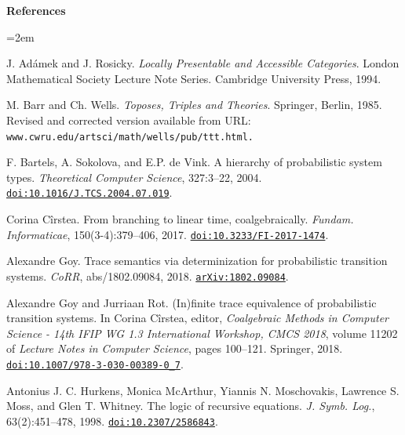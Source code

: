 \documentclass[11pt,a4paper]{amsart}
\begin{document}
%
\hypertarget{html:bib}{} \par\noindent\textbf{References}\quad  
\begin{list}{}{\leftmargin=2em}
\hypertarget{html:bib.bib1}{}
\item[]  [1]  J. Adámek and J. Rosicky.  \emph{Locally Presentable and Accessible Categories}.  London Mathematical Society Lecture Note Series. Cambridge University Press, 1994.  
\hypertarget{html:bib.bib2}{}
\item[]  [2]  M. Barr and Ch. Wells.  \emph{Toposes, Triples and Theories}.  Springer, Berlin, 1985.  Revised and corrected version available from URL: \nolinkurl{www.cwru.edu/artsci/math/wells/pub/ttt.html.}  
\hypertarget{html:bib.bib3}{}
\item[]  [3]  F. Bartels, A. Sokolova, and E.P. de Vink.  A hierarchy of probabilistic system types.  \emph{Theoretical Computer Science}, 327:3–22, 2004.  \href{https://doi.org/10.1016/J.TCS.2004.07.019}{\nolinkurl{doi:10.1016/J.TCS.2004.07.019}}.  
\hypertarget{html:bib.bib4}{}
\item[]  [4]  Corina Cîrstea.  From branching to linear time, coalgebraically.  \emph{Fundam. Informaticae}, 150(3-4):379–406, 2017.  \href{https://doi.org/10.3233/FI-2017-1474}{\nolinkurl{doi:10.3233/FI-2017-1474}}.  
\hypertarget{html:bib.bib5}{}
\item[]  [5]  Alexandre Goy.  Trace semantics via determinization for probabilistic transition systems.  \emph{CoRR}, abs/1802.09084, 2018.  \href{https://arxiv.org/abs/1802.09084}{\texttt{arXiv:1802.09084}}.  
\hypertarget{html:bib.bib6}{}
\item[]  [6]  Alexandre Goy and Jurriaan Rot.  (In)finite trace equivalence of probabilistic transition systems.  In Corina Cîrstea, editor, \emph{Coalgebraic Methods in Computer Science - 14th IFIP WG 1.3 International Workshop, CMCS 2018}, volume 11202 of \emph{Lecture Notes in Computer Science}, pages 100–121. Springer, 2018.  \href{https://doi.org/10.1007/978-3-030-00389-0_7}{\nolinkurl{doi:10.1007/978-3-030-00389-0_7}}.  
\hypertarget{html:bib.bib7}{}
\item[]  [7]  Antonius J. C. Hurkens, Monica McArthur, Yiannis N. Moschovakis, Lawrence S. Moss, and Glen T. Whitney.  The logic of recursive equations.  \emph{J. Symb. Log.}, 63(2):451–478, 1998.  \href{https://doi.org/10.2307/2586843}{\nolinkurl{doi:10.2307/2586843}}.  

\end{list}
\end{document}
